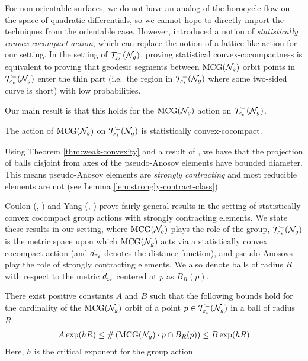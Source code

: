 For non-orientable surfaces, we do not have an analog of the horocycle flow on the space of quadratic differentials, so we cannot hope to directly import the techniques from the orientable case.
However, \textcite{10.1093/imrn/rny001} introduced a notion of \emph{statistically convex-cocompact action}, which can replace the notion of a lattice-like action for our setting.
In the setting of $\mathcal{T}_{\varepsilon_t}^{-}(\mathcal{N}_g)$, proving statistical convex-cocompactness is equivalent to proving that geodesic segments between $\mathrm{MCG}(\mathcal{N}_g)$ orbit points in $\mathcal{T}_{\varepsilon_t}^{-}(\mathcal{N}_g)$ enter the thin part (i.e.\ the region in $\mathcal{T}_{\varepsilon_t}^{-}(\mathcal{N}_g)$ where some two-sided curve is short) with low probabilities.

Our main result is that this holds for the $\mathrm{MCG}(\mathcal{N}_g)$ action on $\mathcal{T}_{\varepsilon_t}^{-}(\mathcal{N}_g)$.
\begin{theorem}
  \label{thm:statistical-convex-cocompactness}
  The action of $\mathrm{MCG}(\mathcal{N}_g)$ on $\mathcal{T}_{\varepsilon_t}^{-}(\mathcal{N}_g)$ is statistically convex-cocompact.
\end{theorem}

Using Theorem \ref{thm:weak-convexity} and a result of \textcite{minsky1996quasi}, we have that the projection of balls disjoint from axes of the pseudo-Anosov elements have bounded diameter.
This means pseudo-Anosov elements are \emph{strongly contracting} and most reducible elements are not (see Lemma \ref{lem:strongly-contract-class}).

Coulon (\cite{coulon2022patterson}, \cite{coulon2024ergodicity}) and Yang (\cite{10.1093/imrn/rny001}, \cite{yang2020genericity}) prove fairly general results in the setting of statistically convex cocompact group actions with strongly contracting elements.
We state these results in our setting, where $\mathrm{MCG}(\mathcal{N}_g)$ plays the role of the group, $\mathcal{T}_{\varepsilon_t}^{-}(\mathcal{N}_g)$ is the metric space upon which $\mathrm{MCG}(\mathcal{N}_g)$ acts via a statistically convex cocompact action (and $d_{\varepsilon_t}$ denotes the distance function), and pseudo-Anosovs play the role of strongly contracting elements.
We also denote balls of radius $R$ with respect to the metric $d_{\varepsilon_t}$ centered at $p$ as $B_R(p)$.

\begin{theorem}
  There exist positive constants $A$ and $B$ such that the following bounds hold for the cardinality of the $\mathrm{MCG}(\mathcal{N}_g)$ orbit of a point $p \in \mathcal{T}_{\varepsilon_t}^{-}(\mathcal{N}_g)$ in a ball of radius $R$.
  \begin{align*}
    A \exp(hR) \leq \#\left( \mathrm{MCG}(\mathcal{N}_g) \cdot p \cap B_R(p) \right) \leq B \exp(hR)
  \end{align*}
  Here, $h$ is the critical exponent for the group action.
\end{theorem}

